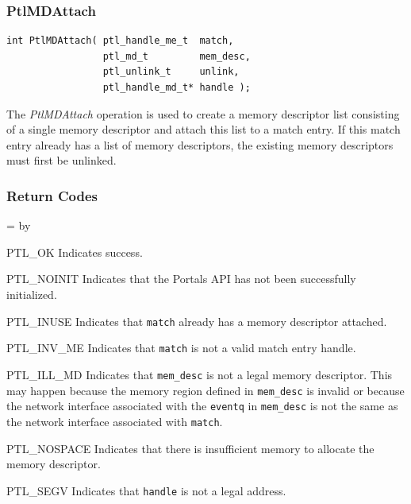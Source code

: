 \documentclass{sand-report}
\newcommand{\retlabel}[1]{\mbox{\texttt{#1}}\hfil}
\newenvironment{returns}%
  {\begin{list}{}%
      {\renewcommand{\makelabel}{\retlabel}%
        \topsep=0.0pt%
        \labelwidth=1.25in%
        \leftmargin=\labelwidth%
        \advance \leftmargin by \labelsep%
        \setlength{\itemsep}{.5\smallskipamount}%
        \setlength{\parsep}{0pt}}%
      }%
  {\end{list}}
\begin{document}
\subsubsection{PtlMDAttach}\label{sec:mdattach}
\begin{verbatim}
int PtlMDAttach( ptl_handle_me_t  match,
                 ptl_md_t         mem_desc,
                 ptl_unlink_t     unlink,
                 ptl_handle_md_t* handle );
\end{verbatim}

\noindent
The \emph{PtlMDAttach} operation is used to create a memory descriptor
list consisting of a single memory descriptor and attach this list to
a match entry.  If this match entry already has a list of memory
descriptors, the existing memory descriptors must first be unlinked.

\subsubsection*{Return Codes}
\begin{returns}
\item[PTL_OK] Indicates success.
\item[PTL_NOINIT] Indicates that the Portals API has not been
  successfully initialized.
\item[PTL_INUSE] Indicates that \texttt{match} already has a memory
descriptor attached.
\item[PTL_INV_ME] Indicates that \texttt{match} is not a valid
  match entry handle.
\item[PTL_ILL_MD] Indicates that \texttt{mem_desc} is not a legal
  memory descriptor.  This may happen because the memory region
  defined in \texttt{mem_desc} is invalid or because the network
  interface associated with the \texttt{eventq} in \texttt{mem_desc}
  is not the same as the network interface associated with
  \texttt{match}.
\item[PTL_NOSPACE] Indicates that there is insufficient memory to
  allocate the memory descriptor.
\item[PTL_SEGV] Indicates that \texttt{handle} is not a legal address.
\end{returns}
\end{document}

